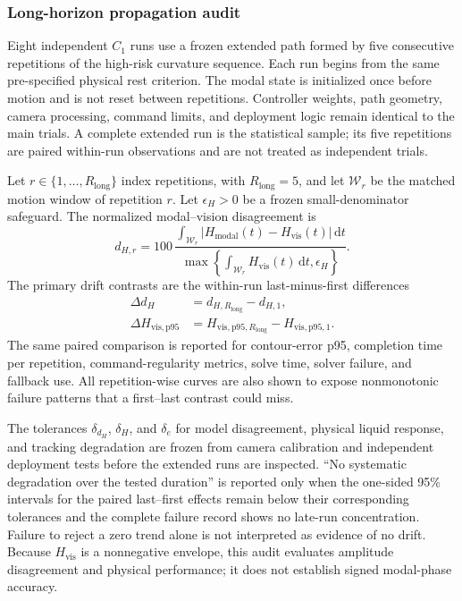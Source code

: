 \subsubsection{Long-horizon propagation audit}

Eight independent $C_1$ runs use a frozen extended path formed by five
consecutive repetitions of the high-risk curvature sequence. Each run begins
from the same pre-specified physical rest criterion. The modal state is
initialized once before motion and is not reset between repetitions. Controller
weights, path geometry, camera processing, command limits, and deployment logic
remain identical to the main \SMPCC{} trials. A complete extended run is the
statistical sample; its five repetitions are paired within-run observations and
are not treated as independent trials.

Let $r\in\{1,\ldots,R_{\mathrm{long}}\}$ index repetitions, with
$R_{\mathrm{long}}=5$, and let $\mathcal W_r$ be the matched motion window of
repetition $r$. Let $\epsilon_H>0$ be a frozen small-denominator safeguard.
The normalized modal--vision disagreement is
\begin{equation}
  d_{H,r}
  =100\,
  \frac{
  \int_{\mathcal W_r}
  |H_{\mathrm{modal}}(t)-H_{\mathrm{vis}}(t)|\,\mathrm dt}
  {\max\!\left\{
  \int_{\mathcal W_r}H_{\mathrm{vis}}(t)\,\mathrm dt,
  \epsilon_H
  \right\}}.
  \label{eq:long_horizon_disagreement}
\end{equation}
The primary drift contrasts are the within-run last-minus-first differences
\begin{equation}
\begin{aligned}
  \Delta d_H
  &=d_{H,R_{\mathrm{long}}}-d_{H,1},\\
  \Delta H_{\mathrm{vis,p95}}
  &=H_{\mathrm{vis,p95},R_{\mathrm{long}}}
  -H_{\mathrm{vis,p95},1}.
\end{aligned}
  \label{eq:long_horizon_drift_contrasts}
\end{equation}
The same paired comparison is reported for contour-error p95, completion time
per repetition, command-regularity metrics, solve time, solver failure, and
fallback use. All repetition-wise curves are also shown to expose nonmonotonic
failure patterns that a first--last contrast could miss.

The tolerances $\delta_{d_H}$, $\delta_{H}$, and $\delta_e$ for model
disagreement, physical liquid response, and tracking degradation are frozen
from camera calibration and independent deployment tests before the extended
runs are inspected. ``No systematic degradation over the tested duration'' is
reported only when the one-sided 95\% intervals for the paired last--first
effects remain below their corresponding tolerances and the complete failure
record shows no late-run concentration. Failure to reject a zero trend alone is
not interpreted as evidence of no drift. Because $H_{\mathrm{vis}}$ is a
nonnegative envelope, this audit evaluates amplitude disagreement and physical
performance; it does not establish signed modal-phase accuracy.

